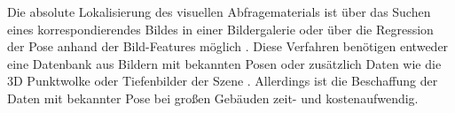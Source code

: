 Die absolute Lokalisierung des visuellen Abfragematerials ist über das Suchen eines korrespondierendes Bildes in einer Bildergalerie oder über die Regression der Pose anhand der Bild-Features möglich \cite{piascoSurveyVisualBasedLocalization2018}. Diese Verfahren benötigen entweder eine Datenbank aus Bildern mit bekannten Posen \cite{zhangImageBasedLocalization2006, arandjelovicThreeThingsEveryone2012, radenovicCNNImageRetrieval2016} oder zusätzlich Daten wie die 3D Punktwolke \cite{irscharaStructurefrommotionPointClouds2009, liWorldwidePoseEstimation2012, svarmCityScaleLocalizationCameras2017} oder Tiefenbilder der Szene \cite{shottonSceneCoordinateRegression2013a}. Allerdings ist die Beschaffung der Daten mit bekannter Pose bei großen Gebäuden zeit- und kostenaufwendig.





